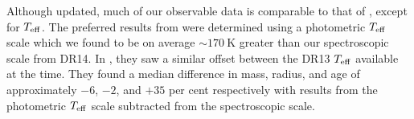 Although updated, much of our observable data is comparable to that of , except for ${T_\mathrm{eff}}$. The preferred results from  were determined using a photometric ${T_\mathrm{eff}}$ scale which we found to be on average $\sim \SI{170}{\kelvin}$ greater than our spectroscopic scale from DR14. In , they saw a similar offset between the DR13 ${T_\mathrm{eff}}$ available at the time. They found a median difference in mass, radius, and age of approximately $-6$, $-2$, and $+35$ per cent respectively with results from the photometric ${T_\mathrm{eff}}$ scale subtracted from the spectroscopic scale.


